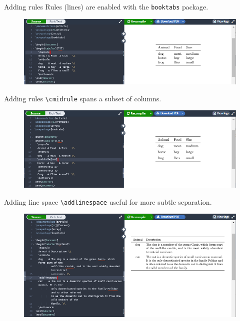 \documentclass{beamer}
\begin{document}
{  \begin{frame}{Adding rules}
    Rules (lines) are enabled with the \texttt{booktabs} package.
    \begin{figure}
      \includegraphics[width=0.9\linewidth]{day01-overleaf-11E-table-rule.png}
    \end{figure}
  \end{frame}

  \begin{frame}{Adding rules}
    \texttt{\textbackslash cmidrule} spans a subset of columns.
    \begin{figure}
      \includegraphics[width=0.9\linewidth]{day01-overleaf-11F-table-cmidrule.png}
    \end{figure}
  \end{frame}

  \begin{frame}{Adding line space}
    \texttt{\textbackslash addlinespace} useful for more subtle separation.
    \begin{figure}
      \includegraphics[width=0.9\linewidth]{day01-overleaf-11G-table-linespace.png}
    \end{figure}
  \end{frame}

}
\end{document}
